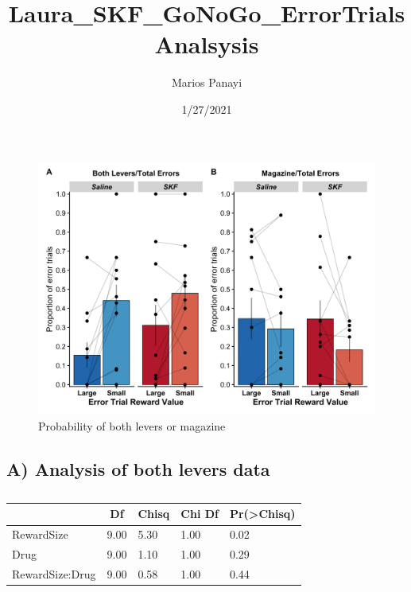 \documentclass[
]{article}
\title{Laura\_SKF\_GoNoGo\_ErrorTrialsAnalsysis}
\author{Marios Panayi}
\date{1/27/2021}
\begin{document}
\maketitle

\begin{figure}
\centering
\includegraphics{../figures/Plots_LeversAndMag.png}
\caption{Probability of both levers or magazine}
\end{figure}

\hypertarget{a-analysis-of-both-levers-data}{%
\subsection{A) Analysis of both levers
data}\label{a-analysis-of-both-levers-data}}

\begin{table}[tbp]

\begin{center}
\begin{threeparttable}

\caption{\label{tab:Analysis 2: Probability of both levers }}

\begin{tabular}{lllll}
\toprule
 & \multicolumn{1}{c}{Df} & \multicolumn{1}{c}{Chisq} & \multicolumn{1}{c}{Chi Df} & \multicolumn{1}{c}{Pr(>Chisq)}\\
\midrule
RewardSize & 9.00 & 5.30 & 1.00 & 0.02\\
Drug & 9.00 & 1.10 & 1.00 & 0.29\\
RewardSize:Drug & 9.00 & 0.58 & 1.00 & 0.44\\
\bottomrule
\end{tabular}

\end{threeparttable}
\end{center}

\end{table}
\end{document}
